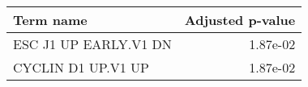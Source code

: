 \begin{tabular}{lr}
\toprule
             Term name &  Adjusted p-value \\
\midrule
 ESC J1 UP EARLY.V1 DN &          1.87e-02 \\
    CYCLIN D1 UP.V1 UP &          1.87e-02 \\
\bottomrule
\end{tabular}
